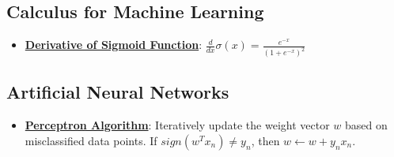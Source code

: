 \documentclass{article}%
\begin{document}
%
\subsection{Calculus for Machine Learning}%
\label{subsec:CalculusforMachineLearning}%
\begin{itemize}[leftmargin=*]%
\item \href{https://purdue.brightspace.com/d2l/common/assets/pdfjs-d2l-dist/1.0.14-legacy/web/viewer.html?file=\%2Fcontent\%2Fenforced\%2F1095467-wl.202510.CS.24300.001\%2F04L1-Linear Algebra Primer.pdf\%3Fou\%3D1095467\&lang=en-us\&container=d2l-fileviewer-rendered-pdf\&fullscreen=d2l-fileviewer-rendered-pdf-dialog\&height=667#page=21}{\textbf{Derivative of Sigmoid Function}}: $\frac{d}{dx} \sigma(x) = \frac{e^{-x}}{(1 + e^{-x})^2}$%
\end{itemize}

%
\subsection{Artificial Neural Networks}%
\label{subsec:ArtificialNeuralNetworks}%
\begin{itemize}[leftmargin=*]%
\item \href{https://purdue.brightspace.com/d2l/common/assets/pdfjs-d2l-dist/1.0.14-legacy/web/viewer.html?file=\%2Fcontent\%2Fenforced\%2F1095467-wl.202510.CS.24300.001\%2F05L2-ML Basics.pdf\%3Fou\%3D1095467\&lang=en-us\&container=d2l-fileviewer-rendered-pdf\&fullscreen=d2l-fileviewer-rendered-pdf-dialog\&height=667#page=30}{\textbf{Perceptron Algorithm}}: Iteratively update the weight vector $w$ based on misclassified data points. If $sign(w^Tx_n) \ne y_n$, then $w \leftarrow w + y_nx_n$.%
\end{itemize}

%
\end{document}
